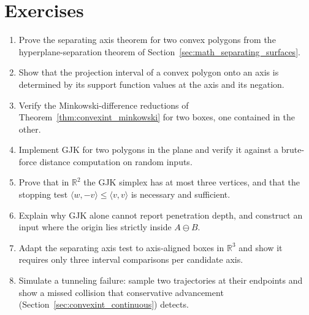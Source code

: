 \section{Exercises}
\label{sec:convexint_exercises}

\begin{enumerate}
  \item Prove the separating axis theorem for two convex polygons from the
    hyperplane-separation theorem of Section~\ref{sec:math_separating_surfaces}.
  \item Show that the projection interval of a convex polygon onto an axis
    is determined by its support function values at the axis and its
    negation.
  \item Verify the Minkowski-difference reductions of
    Theorem~\ref{thm:convexint_minkowski} for two boxes, one contained in
    the other.
  \item Implement GJK for two polygons in the plane and verify it against a
    brute-force distance computation on random inputs.
  \item Prove that in $\mathbb{R}^2$ the GJK simplex has at most three
    vertices, and that the stopping test $\langle w, -v\rangle \le \langle
    v, v\rangle$ is necessary and sufficient.
  \item Explain why GJK alone cannot report penetration depth, and
    construct an input where the origin lies strictly inside
    $A \ominus B$.
  \item Adapt the separating axis test to axis-aligned boxes in
    $\mathbb{R}^3$ and show it requires only three interval comparisons per
    candidate axis.
  \item Simulate a tunneling failure: sample two trajectories at their
    endpoints and show a missed collision that conservative advancement
    (Section~\ref{sec:convexint_continuous}) detects.
\end{enumerate}
